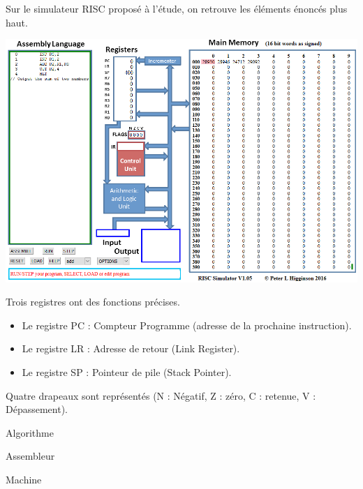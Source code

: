
Sur le simulateur RISC proposé à l'étude, on retrouve les éléments énoncés plus haut.

\begin{center}
\includegraphics[scale=0.5]{images/RISC.png}
\end{center}

Trois registres ont des fonctions précises.

\begin{itemize}
	\item Le registre PC : Compteur Programme (adresse de la prochaine instruction).
	\item Le registre LR : Adresse de retour (Link Register).
	\item Le registre SP : Pointeur de pile (Stack Pointer).
\end{itemize}

Quatre drapeaux sont représentés (N : Négatif, Z : zéro, C : retenue, V : Dépassement).

\begin{multicols}{3}
\centering

Algorithme

Assembleur

Machine
\end{multicols}

